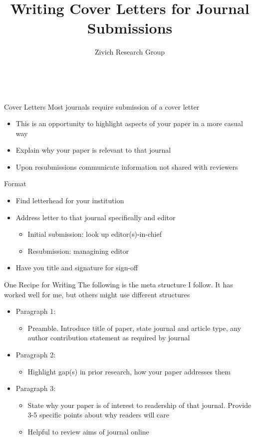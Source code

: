 \documentclass[aspectratio=169]{beamer}
\title[Academia]{Writing Cover Letters for Journal Submissions}
\author[Paul Zivich]{Zivich Research Group}
\date{~}
\begin{document}
\maketitle

\begin{frame}{Cover Letters}
	Most journals require submission of a cover letter
	\begin{itemize}
		\item This is an opportunity to highlight aspects of your paper in a more casual way
		\item Explain why your paper is relevant to that journal
		\item Upon resubmissions communicate information not shared with reviewers
	\end{itemize}
\end{frame}

\begin{frame}{Format}
	\begin{itemize}
		\item Find letterhead for your institution
		\item Address letter to that journal specifically and editor
		\begin{itemize}
			\item Initial submission: look up editor(s)-in-chief
			\item Resubmission: managining editor
		\end{itemize}
		\item Have you title and signature for sign-off
	\end{itemize}
\end{frame}

\begin{frame}{One Recipe for Writing}
	The following is the meta structure I follow. It has worked well for me, but others might use different structures
	\begin{itemize}
		\item Paragraph 1:
		\begin{itemize}
			\item Preamble. Introduce title of paper, state journal and article type, any author contribution statement as required by journal
		\end{itemize}
		\item Paragraph 2:
		\begin{itemize}
			\item Highlight gap(s) in prior research, how your paper addresses them
		\end{itemize}
		\item Paragraph 3:
		\begin{itemize}
			\item State why your paper is of interest to readership of that journal. Provide 3-5 specific points about why readers will care
			\item Helpful to review aims of journal online
		\end{itemize}
	\end{itemize}
\end{frame}
\end{document}
